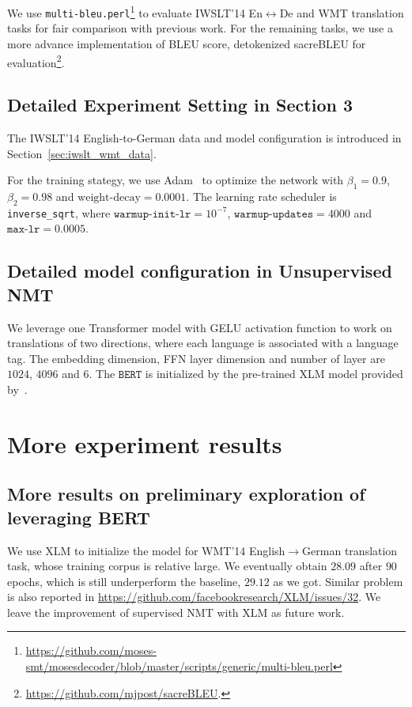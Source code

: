\documentclass{article} \usepackage{iclr2020_conference,times}
\newcommand{\bert}{\texttt{BERT}}
\begin{document}
We use \texttt{multi-bleu.perl}\footnote{\url{https://github.com/moses-smt/mosesdecoder/blob/master/scripts/generic/multi-bleu.perl}} to evaluate IWSLT'14 En$\leftrightarrow$De and WMT translation tasks for fair comparison with previous work. For the remaining tasks, we use a more advance implementation of BLEU score, detokenized sacreBLEU for evaluation\footnote{\url{https://github.com/mjpost/sacreBLEU}.}. 




\subsection{Detailed Experiment Setting in Section 3}\label{preliminary}

The IWSLT'14 English-to-German data and model configuration is introduced in Section~\ref{sec:iwslt_wmt_data}.

For the training stategy, we use Adam~\citep{kingma2014adam} to optimize the network with $\beta_1=0.9$, $\beta_2=0.98$ and $\text{weight-decay}=0.0001$. The learning rate scheduler is \texttt{inverse\_sqrt}, where $\texttt{warmup-init-lr}=10^{-7}$, $\texttt{warmup-updates}=4000$ and $\texttt{max-lr}=0.0005$.




\subsection{Detailed model configuration in Unsupervised NMT}\label{app:unsup}
We leverage one Transformer model with GELU activation function to work on translations of two directions, where each language is associated with a language tag. The embedding dimension, FFN layer dimension and number of layer are $1024$, $4096$ and $6$. The $\bert$ is initialized by the pre-trained XLM model provided by~\citep{lample2019cross}. 

\section{More experiment results}

\subsection{More results on preliminary exploration of leveraging BERT}\label{app:more_results_xlm}
We use XLM to initialize the model for WMT'14 English$\to$German translation task, whose training corpus is relative large. We eventually obtain $28.09$ after $90$ epochs, which is still underperform the baseline, $29.12$ as we got. Similar problem is also reported in \url{https://github.com/facebookresearch/XLM/issues/32}. We leave the improvement of supervised NMT with XLM as future work.
\end{document}
